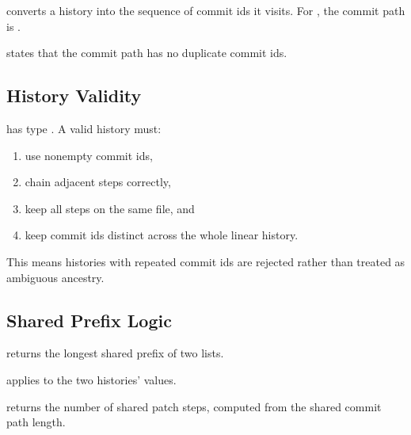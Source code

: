 \begin{definition}[commitPath]
\code{[commitPath]} converts a history into the sequence of commit ids it
visits. For \code{[init -> a1, a1 -> a2]}, the commit path is
\code{[init, a1, a2]}.
\end{definition}

\begin{definition}[distinctCommitIds]
\code{[distinctCommitIds]} states that the commit path has no duplicate commit
ids.
\end{definition}

\subsection{History Validity}

\begin{definition}[validHistory]
\code{[validHistory]} has type . A valid history must:

\begin{enumerate}
  \item use nonempty commit ids,
  \item chain adjacent steps correctly,
  \item keep all steps on the same file, and
  \item keep commit ids distinct across the whole linear history.
\end{enumerate}

This means histories with repeated commit ids are rejected rather than treated
as ambiguous ancestry.
\end{definition}

\subsection{Shared Prefix Logic}

\begin{definition}[commonPrefix]
\code{[commonPrefix]} returns the longest shared prefix of two lists.
\end{definition}

\begin{definition}[sharedCommitPath]
\code{[sharedCommitPath]} applies  to the two histories'
 values.
\end{definition}

\begin{definition}[sharedStepCount]
\code{[sharedStepCount]} returns the number of shared patch steps, computed from
the shared commit path length.
\end{definition}

